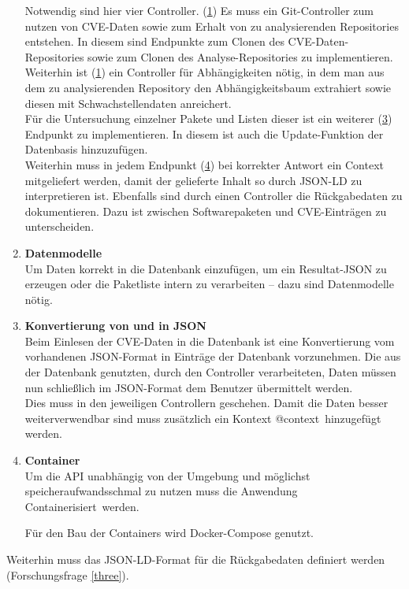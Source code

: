 \begin{enumerate}
            Notwendig sind hier vier Controller.
            (\hyperref[api_controller:one]{1}) Es muss ein Git-Controller zum nutzen von \ac{CVE}-Daten sowie zum Erhalt von zu analysierenden Repositories entstehen.
            In diesem sind Endpunkte zum Clonen des \ac{CVE}-Daten-Repositories sowie zum Clonen des Analyse-Repositories zu implementieren. %
            \\
            Weiterhin ist (\hyperref[api_controller:two]{1}) ein Controller für Abhängigkeiten nötig, in dem man aus dem zu analysierenden Repository den Abhängigkeitsbaum extrahiert sowie diesen mit Schwachstellendaten anreichert.
            \\
            Für die Untersuchung einzelner Pakete und Listen dieser ist ein weiterer (\hyperref[api_controller:three]{3}) Endpunkt zu implementieren.
            In diesem ist auch die Update-Funktion der Datenbasis hinzuzufügen.
            \\
            Weiterhin muss in jedem Endpunkt (\hyperref[api_controller:four]{4}) bei korrekter Antwort ein Context mitgeliefert werden, damit der gelieferte Inhalt so durch \ac{JSON-LD} zu interpretieren ist.
            Ebenfalls sind durch einen Controller die Rückgabedaten zu dokumentieren.
            Dazu ist zwischen Softwarepaketen und \ac{CVE}-Einträgen zu unterscheiden.
        \item \textbf{Datenmodelle} \label{arch_4}\\
            Um Daten korrekt in die Datenbank einzufügen, um ein Resultat-\ac{JSON} zu erzeugen oder die Paketliste intern zu verarbeiten -- dazu sind Datenmodelle nötig.
        \item \textbf{Konvertierung von und in JSON} \label{arch_5}\\
            Beim Einlesen der \ac{CVE}-Daten in die Datenbank ist eine Konvertierung vom vorhandenen \ac{JSON}-Format in Einträge der Datenbank vorzunehmen.
            Die aus der Datenbank genutzten, durch den Controller verarbeiteten, Daten müssen nun schließlich im \ac{JSON}-Format dem Benutzer übermittelt werden.
            \\
            Dies muss in den jeweiligen Controllern geschehen.
            Damit die Daten besser weiterverwendbar sind muss zusätzlich ein Kontext \glqq @context\grqq~hinzugefügt werden.
        \item \textbf{Container} \\
            Um die \ac{API} unabhängig von der Umgebung und möglichst speicheraufwandsschmal zu nutzen muss die Anwendung \glqq Containerisiert\grqq~werden.

            Für den Bau der Containers wird Docker-Compose genutzt.
    \end{enumerate}
    Weiterhin muss das \ac{JSON-LD}-Format für die Rückgabedaten definiert werden (Forschungsfrage \ref{three}).
